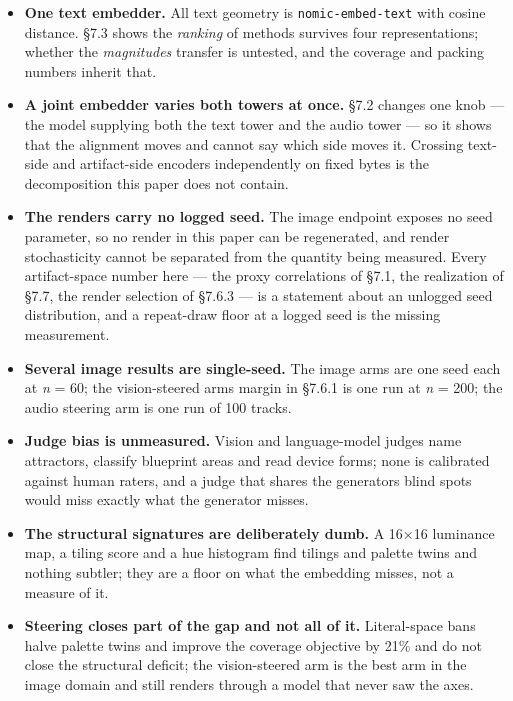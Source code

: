\documentclass[
  10pt,
]{article}
\providecommand{\tightlist}{%
  \setlength{\itemsep}{0pt}\setlength{\parskip}{0pt}}
\theoremstyle{plain}
\theoremstyle{definition}
\providecommand{\tightlist}{\setlength{\itemsep}{0pt}\setlength{\parskip}{0pt}}
\begin{document}
\begin{itemize}
\tightlist
\item
  \textbf{One text embedder.} All text geometry is
  \texttt{nomic-embed-text} with cosine distance. §7.3 shows the
  \emph{ranking} of methods survives four representations; whether the
  \emph{magnitudes} transfer is untested, and the coverage and packing
  numbers inherit that.
\item
  \textbf{A joint embedder varies both towers at once.} §7.2 changes one
  knob --- the model supplying both the text tower and the audio tower
  --- so it shows that the alignment moves and cannot say which side
  moves it. Crossing text-side and artifact-side encoders independently
  on fixed bytes is the decomposition this paper does not contain.
\item
  \textbf{The renders carry no logged seed.} The image endpoint exposes
  no seed parameter, so no render in this paper can be regenerated, and
  render stochasticity cannot be separated from the quantity being
  measured. Every artifact-space number here --- the proxy correlations
  of §7.1, the realization of §7.7, the render selection of §7.6.3 ---
  is a statement about an unlogged seed distribution, and a repeat-draw
  floor at a logged seed is the missing measurement.
\item
  \textbf{Several image results are single-seed.} The image arms are one
  seed each at \emph{n} = 60; the vision-steered arm\textquotesingle s
  margin in §7.6.1 is one run at \emph{n} = 200; the audio steering arm
  is one run of 100 tracks.
\item
  \textbf{Judge bias is unmeasured.} Vision and language-model judges
  name attractors, classify blueprint areas and read device forms; none
  is calibrated against human raters, and a judge that shares the
  generator\textquotesingle s blind spots would miss exactly what the
  generator misses.
\item
  \textbf{The structural signatures are deliberately dumb.} A 16×16
  luminance map, a tiling score and a hue histogram find tilings and
  palette twins and nothing subtler; they are a floor on what the
  embedding misses, not a measure of it.
\item
  \textbf{Steering closes part of the gap and not all of it.}
  Literal-space bans halve palette twins and improve the coverage
  objective by 21\% and do not close the structural deficit; the
  vision-steered arm is the best arm in the image domain and still
  renders through a model that never saw the axes.
\end{itemize}
\end{document}
